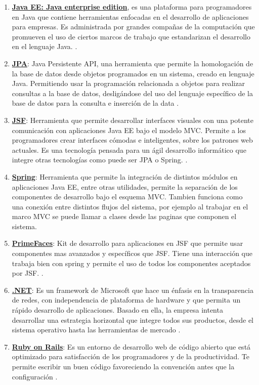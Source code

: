 \documentclass[a4paper,12pt,openany,oneside]{book}
\begin{document}
\begin{enumerate}
	\item \textbf{\underline{Java EE: Java enterprise edition}}, es una plataforma para programadores en Java que contiene herramientas enfocadas en el desarrollo de aplicaciones para empresas. Es administrada por grandes compañas de la computación que promueven el uso de ciertos marcos de trabajo que estandarizan el desarrollo en el lenguaje Java. \cite{data14}.
	\item \textbf{\underline{JPA}}: Java Persistente API, una herramienta que permite la homologación de la base de datos desde objetos programados en un sistema, creado en lenguaje Java. Permitiendo usar la programación relacionada a objetos para realizar consultas a la base de datos, desligándose del uso del lenguaje específico de la base de datos para la consulta e inserción de la data \cite{data13}.
	\item \textbf{\underline{JSF}}: Herramienta que permite desarrollar interfaces visuales con una potente comunicación con aplicaciones Java EE bajo el modelo MVC. Permite a los programadores crear interfaces cómodas e inteligentes, sobre los patrones web actuales. Es una tecnología pensada para un ágil desarrollo informático que integre otras tecnologías como puede ser JPA o Spring. \cite{data16}.
	\item \textbf{\underline{Spring}}: Herramienta que permite la integración de distintos módulos en aplicaciones Java EE, entre otras utilidades, permite la separación de los componentes de desarrollo bajo el esquema MVC. Tambien funciona como una conexión entre distintos flujos del sistema, por ejemplo al trabajar en el marco MVC se puede llamar a clases desde las paginas que componen el sistema\cite{data15}.
	\item \textbf{\underline{PrimeFaces}}: Kit de desarrollo para aplicaciones en JSF que permite usar componentes mas avanzados y específicos que JSF. Tiene una interacción que trabaja bien con spring y permite el uso de todos los componentes aceptados por JSF. \cite{data17}.
	\item \textbf{\underline{.NET}}: Es un framework de Microsoft que hace un énfasis en la transparencia de redes, con independencia de plataforma de hardware y que permita un rápido desarrollo de aplicaciones. Basado en ella, la empresa intenta desarrollar una estrategia horizontal que integre todos sus productos, desde el sistema operativo hasta las herramientas de mercado \cite{data8}.
	\item \textbf{\underline{Ruby on Rails}}: Es un entorno de desarrollo web de código abierto que está optimizado para satisfacción de los programadores y de la productividad. Te permite escribir un buen código favoreciendo la convención antes que la configuración \cite{data9}.

\end{enumerate}
\end{document}
